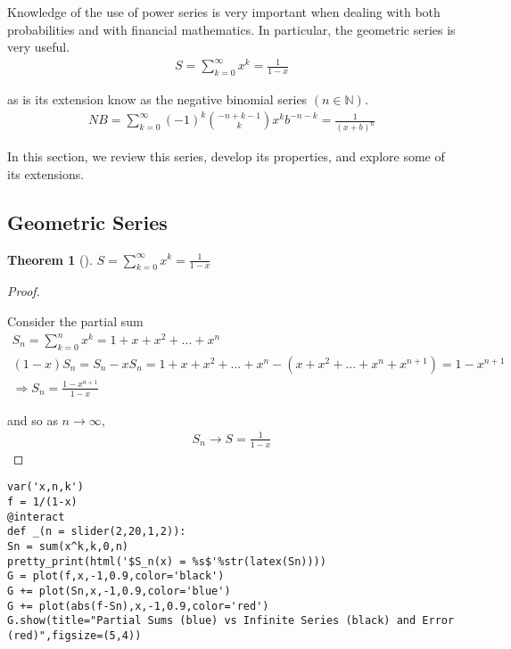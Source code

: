 \documentclass[10pt,]{book}
\theoremstyle{plain}
\newtheorem{theorem}{Theorem}[section]
\theoremstyle{definition}
\theoremstyle{definition}
\numberwithin{equation}{section}
\begin{document}
	  Knowledge of the use of power series is very important when dealing with both probabilities 
	  and with financial mathematics.  
	  In particular, the geometric series is very useful. %
\begin{gather*}
S = \sum_{k=0}^{\infty} {x^k} = \frac{1}{1-x}
\end{gather*}\par
as is its extension know as the negative binomial series \(( n \in \mathbb{N} )\).%
\begin{gather*}
NB = \sum_{k=0}^{\infty} (-1)^k \binom{-n + k - 1}{k} {x^k b^{-n-k}} = \frac{1}{(x+b)^n}
\end{gather*}\par
In this section, we review this series, develop its properties, and explore some of its extensions.%
\typeout{************************************************}
\typeout{************************************************}
\subsection[Geometric Series]{Geometric Series}\label{subsection-1}
\begin{theorem}[]\label{theorem-GeomSeries}
\( S = \sum_{k=0}^{\infty} {x^k} = \frac{1}{1-x}\)\end{theorem}
\begin{proof}\hypertarget{proof-1}{}
Consider the partial sum%
\begin{gather*}
 S_n = \sum_{k=0}^{n} {x^k} = 1 + x + x^2 + ... + x^n \\
 (1-x)S_n = S_n - x S_n = 1 + x + x^2 + ... + x^n - (x + x^2 + ... + x^n + x^{n+1}) = 1 - x^{n+1} \\
 \Rightarrow S_n = \frac{1-x^{n+1}}{1-x} 
\end{gather*}\par
and so as \( n \rightarrow \infty \),%
\begin{gather*}
 S_n \rightarrow S = \frac{1}{1-x} 
\end{gather*}\end{proof}
\begin{lstlisting}[style=sageinput]
var('x,n,k')
f = 1/(1-x)
@interact
def _(n = slider(2,20,1,2)):
Sn = sum(x^k,k,0,n)
pretty_print(html('$S_n(x) = %s$'%str(latex(Sn))))
G = plot(f,x,-1,0.9,color='black')
G += plot(Sn,x,-1,0.9,color='blue')
G += plot(abs(f-Sn),x,-1,0.9,color='red')
G.show(title="Partial Sums (blue) vs Infinite Series (black) and Error (red)",figsize=(5,4))
\end{lstlisting}
\typeout{************************************************}
\typeout{************************************************}
\end{document}
